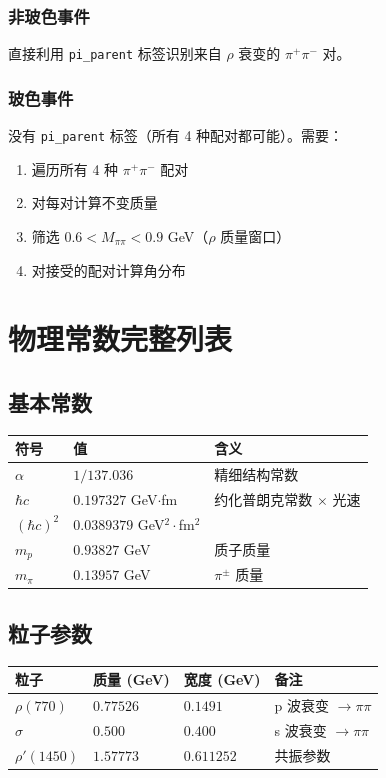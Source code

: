 \documentclass[11pt,a4paper,UTF8]{ctexart}
\begin{document}
\subsubsection{非玻色事件}

直接利用 \texttt{pi\_parent} 标签识别来自 $\rho$ 衰变的 $\pi^+\pi^-$ 对。

\subsubsection{玻色事件}

没有 \texttt{pi\_parent} 标签（所有 4 种配对都可能）。需要：
\begin{enumerate}[leftmargin=2em]
    \item 遍历所有 4 种 $\pi^+\pi^-$ 配对
    \item 对每对计算不变质量
    \item 筛选 $0.6 < M_{\pi\pi} < 0.9$ GeV（$\rho$ 质量窗口）
    \item 对接受的配对计算角分布
\end{enumerate}

\section{物理常数完整列表}

\subsection{基本常数}

\begin{longtable}{l l l}
\toprule
\textbf{符号} & \textbf{值} & \textbf{含义} \\
\midrule
$\alpha$ & $1/137.036$ & 精细结构常数 \\
$\hbar c$ & $0.197327$ GeV$\cdot$fm & 约化普朗克常数 $\times$ 光速 \\
$(\hbar c)^2$ & $0.0389379$ GeV$^2\cdot$fm$^2$ & \\
$m_p$ & $0.93827$ GeV & 质子质量 \\
$m_\pi$ & $0.13957$ GeV & $\pi^\pm$ 质量 \\
\bottomrule
\end{longtable}

\subsection{粒子参数}

\begin{longtable}{l l l l}
\toprule
\textbf{粒子} & \textbf{质量 (GeV)} & \textbf{宽度 (GeV)} & \textbf{备注} \\
\midrule
$\rho(770)$ & $0.77526$ & $0.1491$ & p 波衰变 $\to \pi\pi$ \\
$\sigma$ & $0.500$ & $0.400$ & s 波衰变 $\to \pi\pi$ \\
$\rho'(1450)$ & $1.57773$ & $0.611252$ & 共振参数 \\
\bottomrule
\end{longtable}
\end{document}
